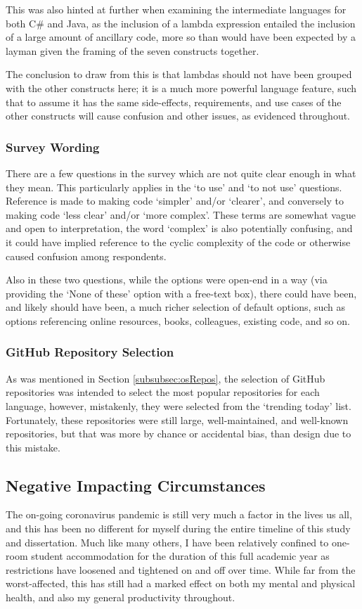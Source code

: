 \documentclass{article}
\begin{document}
            This was also hinted at further when examining the intermediate languages for both C\# and Java, as the inclusion of a lambda expression entailed the inclusion of a large amount of ancillary code, more so than would have been expected by a layman given the framing of the seven constructs together.
            
            The conclusion to draw from this is that lambdas should not have been grouped with the other constructs here; it is a much more powerful language feature, such that to assume it has the same side-effects, requirements, and use cases of the other constructs will cause confusion and other issues, as evidenced throughout.
        \subsubsection{Survey Wording}
        \label{subsubsec:surveyWording}
            There are a few questions in the survey which are not quite clear enough in what they mean. This particularly applies in the `to use' and `to not use' questions. Reference is made to making code `simpler' and/or `clearer', and conversely to making code `less clear' and/or `more complex'. These terms are somewhat vague and open to interpretation, the word `complex' is also potentially confusing, and it could have implied reference to the cyclic complexity of the code or otherwise caused confusion among respondents.

            Also in these two questions, while the options were open-end in a way (via providing the `None of these' option with a free-text box), there could have been, and likely should have been, a much richer selection of default options, such as options referencing online resources, books, colleagues, existing code, and so on.

        \subsubsection{GitHub Repository Selection}
            As was mentioned in Section \ref{subsubsec:osRepos}, the selection of GitHub repositories was intended to select the most popular repositories for each language, however, mistakenly, they were selected from the `trending today' list. Fortunately, these repositories were still large, well-maintained, and well-known repositories, but that was more by chance or accidental bias, than design due to this mistake.
        
    \subsection{Negative Impacting Circumstances}
        The on-going coronavirus pandemic is still very much a factor in the lives us all, and this has been no different for myself during the entire timeline of this study and dissertation. Much like many others, I have been relatively confined to one-room student accommodation for the duration of this full academic year as restrictions have loosened and tightened on and off over time. While far from the worst-affected, this has still had a marked effect on both my mental and physical health, and also my general productivity throughout.
\end{document}
